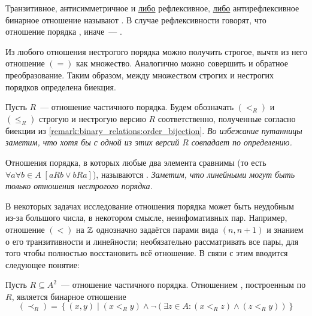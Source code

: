 \begin{definition}
    Транзитивное, антисимметричное и \underline{либо} рефлексивное, \underline{либо} антирефлексивное бинарное отношение называют .
    В случае рефлексивности говорят, что отношение порядка , иначе~--- .
\end{definition}

\begin{remark}
    \label{remark:binary_relations:order_bijection}
    Из любого отношения нестрогого порядка можно получить строгое, вычтя из него отношение $ (=) $ как множество.
    Аналогично можно совершить и обратное преобразование.
    Таким образом, между множеством строгих и нестрогих порядков определена биекция.
\end{remark}

\begin{definition}
    Пусть $ R $~--- отношение частичного порядка.
    Будем обозначать $ (<_R) $ и $ (\leqslant_R) $ строгую и нестрогую версию $ R $ соответственно,
    полученные согласно биекции из \ref{remark:binary_relations:order_bijection}.
    \textit{Во избежание путанницы заметим, что хотя бы с одной из этих версий $ R $ совпадает по определению.}
\end{definition}

\begin{definition}
    Отношения порядка, в которых любые два элемента сравнимы (то есть $ \forall a \forall b \in A \; \left[a R b \vee b R a \right]$),
    называются .
    \newline
    \textit{Заметим, что линейными могут быть только отношения нестрогого порядка.}
\end{definition}

В некоторых задачах исследование отношения порядка может быть неудобным из-за большого числа, в некотором смысле, неинфомативных пар.
Например, отношение $ (<) $ на $ \mathbb{Z} $ однозначно задаётся парами вида $ (n, n+1) $ и знанием о его транзитивности и линейности;
необязательно рассматривать все пары, для того чтобы полностью восстановить всё отношение.
В связи с этим вводится следующее понятие:

\begin{definition}
    Пусть $ R \subseteq A^2 $~--- отношение частичного порядка.
    Отношением , построенным по $ R $, является бинарное отношение
    \[
        (\prec_R) = \left\{ (x, y) \mid (x <_R y) \wedge \neg \left( \exists z \in A: (x <_R z) \wedge (z <_R y) \right) \right\}
    \]
\end{definition}

